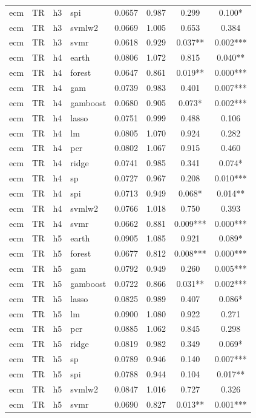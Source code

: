 \begin{ThreePartTable}
\begin{longtable}[t]{llclcccc}
ecm & TR & h3 & spi & 0.0657 & 0.987 & 0.299 & 0.100*\\
ecm & TR & h3 & svmlw2 & 0.0669 & 1.005 & 0.653 & 0.384\\
ecm & TR & h3 & svmr & 0.0618 & 0.929 & 0.037** & 0.002***\\
\addlinespace
ecm & TR & h4 & earth & 0.0806 & 1.072 & 0.815 & 0.040**\\
ecm & TR & h4 & forest & 0.0647 & 0.861 & 0.019** & 0.000***\\
ecm & TR & h4 & gam & 0.0739 & 0.983 & 0.401 & 0.007***\\
ecm & TR & h4 & gamboost & 0.0680 & 0.905 & 0.073* & 0.002***\\
ecm & TR & h4 & lasso & 0.0751 & 0.999 & 0.488 & 0.106\\
ecm & TR & h4 & lm & 0.0805 & 1.070 & 0.924 & 0.282\\
ecm & TR & h4 & pcr & 0.0802 & 1.067 & 0.915 & 0.460\\
ecm & TR & h4 & ridge & 0.0741 & 0.985 & 0.341 & 0.074*\\
ecm & TR & h4 & sp & 0.0727 & 0.967 & 0.208 & 0.010***\\
ecm & TR & h4 & spi & 0.0713 & 0.949 & 0.068* & 0.014**\\
ecm & TR & h4 & svmlw2 & 0.0766 & 1.018 & 0.750 & 0.393\\
ecm & TR & h4 & svmr & 0.0662 & 0.881 & 0.009*** & 0.000***\\
\addlinespace
ecm & TR & h5 & earth & 0.0905 & 1.085 & 0.921 & 0.089*\\
ecm & TR & h5 & forest & 0.0677 & 0.812 & 0.008*** & 0.000***\\
ecm & TR & h5 & gam & 0.0792 & 0.949 & 0.260 & 0.005***\\
ecm & TR & h5 & gamboost & 0.0722 & 0.866 & 0.031** & 0.002***\\
ecm & TR & h5 & lasso & 0.0825 & 0.989 & 0.407 & 0.086*\\
ecm & TR & h5 & lm & 0.0900 & 1.080 & 0.922 & 0.271\\
ecm & TR & h5 & pcr & 0.0885 & 1.062 & 0.845 & 0.298\\
ecm & TR & h5 & ridge & 0.0819 & 0.982 & 0.349 & 0.069*\\
ecm & TR & h5 & sp & 0.0789 & 0.946 & 0.140 & 0.007***\\
ecm & TR & h5 & spi & 0.0788 & 0.944 & 0.104 & 0.017**\\
ecm & TR & h5 & svmlw2 & 0.0847 & 1.016 & 0.727 & 0.326\\
ecm & TR & h5 & svmr & 0.0690 & 0.827 & 0.013** & 0.001***\\

\end{longtable}
\end{ThreePartTable}
